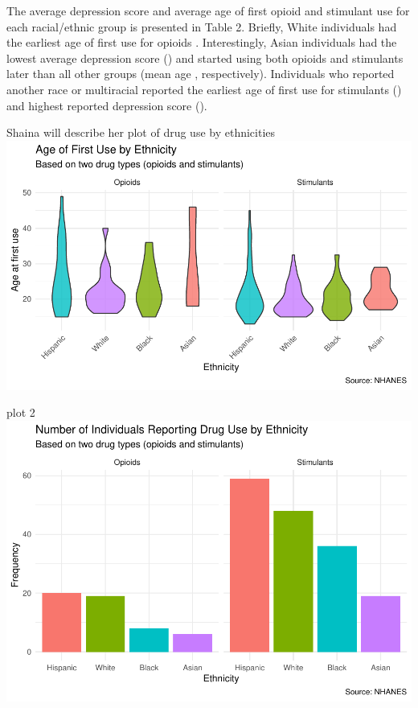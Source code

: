 \documentclass[man]{apa6}
\begin{document}
The average depression score and average age of first opioid and
stimulant use for each racial/ethnic group is presented in Table 2.
Briefly, White individuals had the earliest age of first use for opioids
. Interestingly, Asian individuals had the lowest average depression
score () and started using both opioids and stimulants later than all
other groups (mean age , respectively). Individuals who reported another
race or multiracial reported the earliest age of first use for
stimulants () and highest reported depression score ().

Shaina will describe her plot of drug use by ethnicities
\includegraphics{Final_Paper_Group_3_files/figure-latex/ST_plot1-1.pdf}

plot 2
\includegraphics{Final_Paper_Group_3_files/figure-latex/ST_plot-1.pdf}
\end{document}
